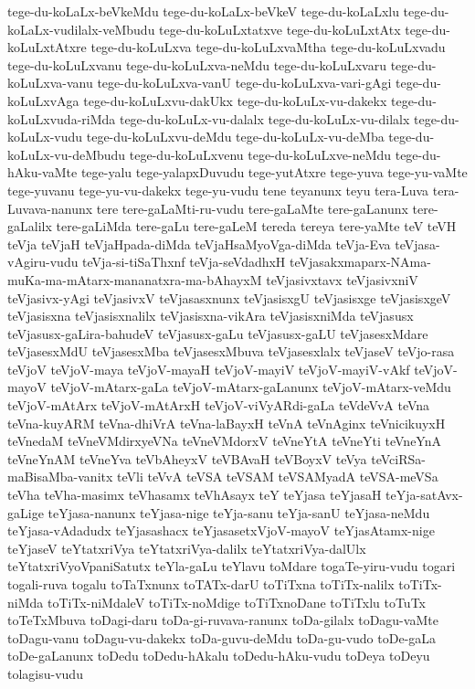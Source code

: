 {tege-du-koLaLx-beVkeMdu
tege-du-koLaLx-beVkeV
tege-du-koLaLxlu
tege-du-koLaLx-vudilalx-veMbudu
tege-du-koLuLxtatxve
tege-du-koLuLxtAtx
tege-du-koLuLxtAtxre
tege-du-koLuLxva
tege-du-koLuLxvaMtha
tege-du-koLuLxvadu
tege-du-koLuLxvanu
tege-du-koLuLxva-neMdu
tege-du-koLuLxvaru
tege-du-koLuLxva-vanu
tege-du-koLuLxva-vanU
tege-du-koLuLxva-vari-gAgi
tege-du-koLuLxvAga
tege-du-koLuLxvu-dakUkx
tege-du-koLuLx-vu-dakekx
tege-du-koLuLxvuda-riMda
tege-du-koLuLx-vu-dalalx
tege-du-koLuLx-vu-dilalx
tege-du-koLuLx-vudu
tege-du-koLuLxvu-deMdu
tege-du-koLuLx-vu-deMba
tege-du-koLuLx-vu-deMbudu
tege-du-koLuLxvenu
tege-du-koLuLxve-neMdu
tege-du-hAku-vaMte
tege-yalu
tege-yalapxDuvudu
tege-yutAtxre
tege-yuva
tege-yu-vaMte
tege-yuvanu
tege-yu-vu-dakekx
tege-yu-vudu
tene
teyanunx
teyu
tera-Luva
tera-Luvava-nanunx
tere
tere-gaLaMti-ru-vudu
tere-gaLaMte
tere-gaLanunx
tere-gaLalilx
tere-gaLiMda
tere-gaLu
tere-gaLeM
tereda
tereya
tere-yaMte
teV
teVH
teVja
teVjaH
teVjaHpada-diMda
teVjaHsaMyoVga-diMda
teVja-Eva
teVjasa-vAgiru-vudu
teVja-si-tiSaThxnf
teVja-seVdadhxH
teVjasakxmaparx-NAma-muKa-ma-mAtarx-mananatxra-ma-bAhayxM
teVjasivxtavx
teVjasivxniV
teVjasivx-yAgi
teVjasivxV
teVjasasxnunx
teVjasisxgU
teVjasisxge
teVjasisxgeV
teVjasisxna
teVjasisxnalilx
teVjasisxna-vikAra
teVjasisxniMda
teVjasusx
teVjasusx-gaLira-bahudeV
teVjasusx-gaLu
teVjasusx-gaLU
teVjasesxMdare
teVjasesxMdU
teVjasesxMba
teVjasesxMbuva
teVjasesxlalx
teVjaseV
teVjo-rasa
teVjoV
teVjoV-maya
teVjoV-mayaH
teVjoV-mayiV
teVjoV-mayiV-vAkf
teVjoV-mayoV
teVjoV-mAtarx-gaLa
teVjoV-mAtarx-gaLanunx
teVjoV-mAtarx-veMdu
teVjoV-mAtArx
teVjoV-mAtArxH
teVjoV-viVyARdi-gaLa
teVdeVvA
teVna
teVna-kuyARM
teVna-dhiVrA
teVna-laBayxH
teVnA
teVnAginx
teVnicikuyxH
teVnedaM
teVneVMdirxyeVNa
teVneVMdorxV
teVneYtA
teVneYti
teVneYnA
teVneYnAM
teVneYva
teVbAheyxV
teVBAvaH
teVBoyxV
teVya
teVciRSa-maBisaMba-vanitx
teVli
teVvA
teVSA
teVSAM
teVSAMyadA
teVSA-meVSa
teVha
teVha-masimx
teVhasamx
teVhAsayx
teY
teYjasa
teYjasaH
teYja-satAvx-gaLige
teYjasa-nanunx
teYjasa-nige
teYja-sanu
teYja-sanU
teYjasa-neMdu
teYjasa-vAdadudx
teYjasashacx
teYjasasetxVjoV-mayoV
teYjasAtamx-nige
teYjaseV
teYtatxriVya
teYtatxriVya-dalilx
teYtatxriVya-dalUlx
teYtatxriVyoVpaniSatutx
teYla-gaLu
teYlavu
toMdare
togaTe-yiru-vudu
togari
togali-ruva
togalu
toTaTxnunx
toTATx-darU
toTiTxna
toTiTx-nalilx
toTiTx-niMda
toTiTx-niMdaleV
toTiTx-noMdige
toTiTxnoDane
toTiTxlu
toTuTx
toTeTxMbuva
toDagi-daru
toDa-gi-ruvava-ranunx
toDa-gilalx
toDagu-vaMte
toDagu-vanu
toDagu-vu-dakekx
toDa-guvu-deMdu
toDa-gu-vudo
toDe-gaLa
toDe-gaLanunx
toDedu
toDedu-hAkalu
toDedu-hAku-vudu
toDeya
toDeyu
tolagisu-vudu
}
